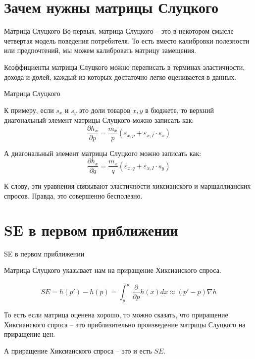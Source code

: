 \documentclass{beamer}
\begin{document}
\section{Зачем нужны матрицы Слуцкого}

\begin{frame}{Матрица Слуцкого}
Во-первых, матрица Слуцкого – это в некотором смысле четвертая модель поведения потребителя. То есть вместо калибровки полезности или предпочтений, мы можем калибровать матрицу замещения. 

Коэффициенты матрицы Слуцкого можно переписать в терминах эластичности, дохода и долей, каждый из которых достаточно легко оценивается в данных. 
\end{frame}

\begin{frame}{Матрица Слуцкого}

К примеру, если $s_x$ и $s_y$ это доли товаров $x, y$ в бюджете, то верхний диагональный элемент матрицы Слуцкого можно записать как:
$$ \frac{\partial h_x}{\partial p} = \frac{m_x}{p} (\varepsilon_{x,p} + \varepsilon_{x,I} \cdot s_x)$$

А диагональный элемент матрицы Слуцкого можно записать как:
$$ \frac{\partial h_x}{\partial q} = \frac{m_x}{q} (\varepsilon_{x,q} + \varepsilon_{x,I} \cdot s_y)$$

К слову, эти уравнения связывают эластичности хиксианского и маршаллианских спросов. Правда, это совершенно бесполезно.

\end{frame}

\section{SE в первом приближении}

\begin{frame}{SE в первом приближении}

Матрица Слуцкого указывает нам на приращение Хиксианского спроса. 

\begin{lemma}
$$ SE = h(p') - h(p) = \int_p^{p'} \frac{\partial}{\partial p} h(x) dx \approx (p'-p) \nabla h$$	
\end{lemma}

То есть если матрица оценена хорошо, то можно сказать, что приращение Хиксианского спроса – это приблизительно произведение матрицы Слуцкого на приращение цен. 

А приращение Хиксианского спроса – это и есть $SE$.

\end{frame}
\end{document}
